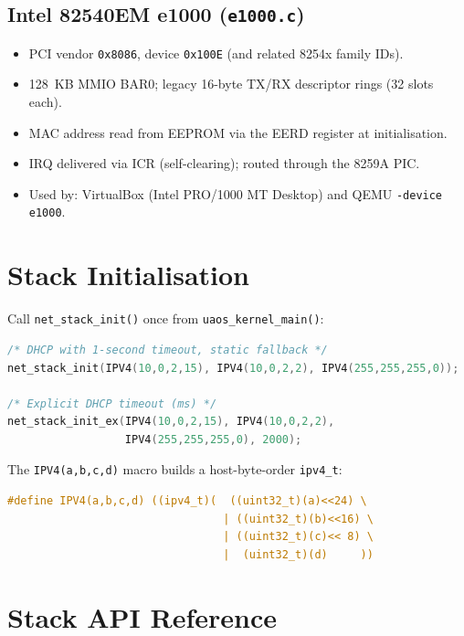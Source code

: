 \documentclass[11pt,a4paper]{report}
\begin{document}
\subsection{Intel 82540EM e1000 (\texttt{e1000.c})}

\begin{itemize}
  \item PCI vendor \texttt{0x8086}, device \texttt{0x100E} (and related 8254x family IDs).
  \item 128~KB MMIO BAR0; legacy 16-byte TX/RX descriptor rings (32 slots each).
  \item MAC address read from EEPROM via the EERD register at initialisation.
  \item IRQ delivered via ICR (self-clearing); routed through the 8259A PIC.
  \item Used by: VirtualBox (Intel PRO/1000 MT Desktop) and QEMU
        \texttt{-device e1000}.
\end{itemize}

\section{Stack Initialisation}

Call \texttt{net\_stack\_init()} once from \texttt{uaos\_kernel\_main()}:

\begin{lstlisting}[language=C]
/* DHCP with 1-second timeout, static fallback */
net_stack_init(IPV4(10,0,2,15), IPV4(10,0,2,2), IPV4(255,255,255,0));

/* Explicit DHCP timeout (ms) */
net_stack_init_ex(IPV4(10,0,2,15), IPV4(10,0,2,2),
                  IPV4(255,255,255,0), 2000);
\end{lstlisting}

\noindent The \texttt{IPV4(a,b,c,d)} macro builds a host-byte-order \texttt{ipv4\_t}:

\begin{lstlisting}[language=C]
#define IPV4(a,b,c,d) ((ipv4_t)(  ((uint32_t)(a)<<24) \
                                 | ((uint32_t)(b)<<16) \
                                 | ((uint32_t)(c)<< 8) \
                                 |  (uint32_t)(d)     ))
\end{lstlisting}

\section{Stack API Reference}
\end{document}
